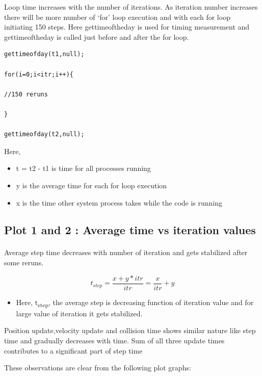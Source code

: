 \documentclass[11pt]{article}
\begin{document}
	Loop time increases with the number of iterations. As iteration number increases there will be more
	 number of ‘for’ loop execution and with each for loop initiating 150 steps. 
	Here gettimeoftheday is used for timing measurement and gettimeoftheday is called just before and after the for loop.

\begin{lstlisting}
gettimeofday(t1,null);

for(i=0;i<itr;i++){

//150 reruns

}

gettimeofday(t2,null);

\end{lstlisting}

Here, 	
\begin{itemize}
\item t = t2 - t1 is time for all processes running
\item y is the average time for each for loop execution
\item x is the time other system process takes while the code is running
\end{itemize}

\subsection{Plot 1 and 2 : Average time vs iteration values}
\paragraph{}
Average step time decreases with number of iteration and gets stabilized 
after some reruns.

\begin{equation}
	t_{step} = \frac {x + y*itr}{itr} = \frac{x}{itr} + y
\end{equation}


\begin{itemize}
\item Here, t\textsubscript{step}, the average step is decreasing function of iteration value and for 
large value of iteration it gets stabilized.
\end{itemize}

Position update,velocity update and collision time shows similar nature like step time and gradually decreases with time.
Sum of all three update times contributes to a significant part of step time

These observations are clear from the following plot graphs:
\end{document}
